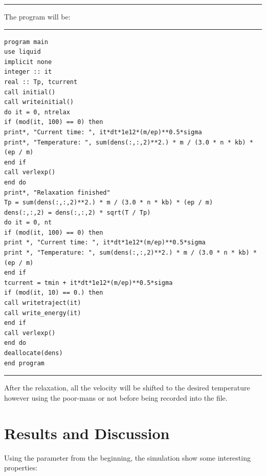 \documentclass[a4paper]{article}
\begin{document}
\rule{\textwidth}{1pt}
The program will be:

\rule{\textwidth}{1pt}
\begin{lstlisting}
program main
use liquid
implicit none
integer :: it
real :: Tp, tcurrent
call initial()
call writeinitial()
do it = 0, ntrelax
if (mod(it, 100) == 0) then
print*, "Current time: ", it*dt*1e12*(m/ep)**0.5*sigma
print*, "Temperature: ", sum(dens(:,:,2)**2.) * m / (3.0 * n * kb) * (ep / m)
end if
call verlexp()
end do
print*, "Relaxation finished"
Tp = sum(dens(:,:,2)**2.) * m / (3.0 * n * kb) * (ep / m)
dens(:,:,2) = dens(:,:,2) * sqrt(T / Tp)
do it = 0, nt
if (mod(it, 100) == 0) then
print *, "Current time: ", it*dt*1e12*(m/ep)**0.5*sigma
print *, "Temperature: ", sum(dens(:,:,2)**2.) * m / (3.0 * n * kb) * (ep / m)
end if
tcurrent = tmin + it*dt*1e12*(m/ep)**0.5*sigma
if (mod(it, 10) == 0.) then
call writetraject(it)
call write_energy(it)
end if
call verlexp()
end do
deallocate(dens)
end program
\end{lstlisting}
\rule{\textwidth}{1pt}
After the relaxation, all the velocity will be shifted to the desired temperature however using the poor-mans or not before being recorded into the file.
\section{Results and Discussion}
Using the parameter from the beginning, the simulation show some interesting properties:
\end{document}
